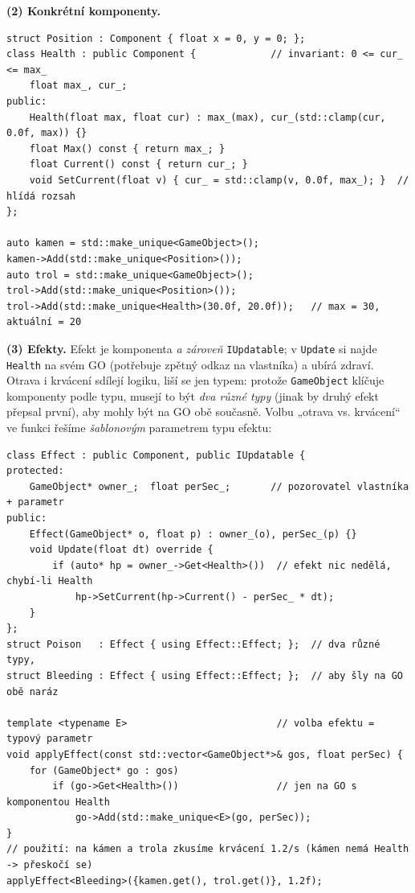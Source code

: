 \documentclass[11pt,a4paper]{article}
\begin{document}
\begin{priklad}
\textbf{(2) Konkrétní komponenty.}
\begin{lstlisting}[style=cpp]
struct Position : Component { float x = 0, y = 0; };
class Health : public Component {             // invariant: 0 <= cur_ <= max_
    float max_, cur_;
public:
    Health(float max, float cur) : max_(max), cur_(std::clamp(cur, 0.0f, max)) {}
    float Max() const { return max_; }
    float Current() const { return cur_; }
    void SetCurrent(float v) { cur_ = std::clamp(v, 0.0f, max_); }  // hlídá rozsah
};

auto kamen = std::make_unique<GameObject>();
kamen->Add(std::make_unique<Position>());
auto trol = std::make_unique<GameObject>();
trol->Add(std::make_unique<Position>());
trol->Add(std::make_unique<Health>(30.0f, 20.0f));   // max = 30, aktuální = 20
\end{lstlisting}

\textbf{(3) Efekty.} Efekt je komponenta \emph{a zároveň} \texttt{IUpdatable}; v \texttt{Update} si najde \texttt{Health} na svém GO (potřebuje zpětný odkaz na vlastníka) a ubírá zdraví. Otrava i krvácení sdílejí logiku, liší se jen typem: protože \texttt{GameObject} klíčuje komponenty podle typu, musejí to být \emph{dva různé typy} (jinak by druhý efekt přepsal první), aby mohly být na GO obě současně. Volbu „otrava vs. krvácení`` ve funkci řešíme \emph{šablonovým} parametrem typu efektu:

\begin{lstlisting}[style=cpp]
class Effect : public Component, public IUpdatable {
protected:
    GameObject* owner_;  float perSec_;       // pozorovatel vlastníka + parametr
public:
    Effect(GameObject* o, float p) : owner_(o), perSec_(p) {}
    void Update(float dt) override {
        if (auto* hp = owner_->Get<Health>())  // efekt nic nedělá, chybí-li Health
            hp->SetCurrent(hp->Current() - perSec_ * dt);
    }
};
struct Poison   : Effect { using Effect::Effect; };  // dva různé typy,
struct Bleeding : Effect { using Effect::Effect; };  // aby šly na GO obě naráz

template <typename E>                          // volba efektu = typový parametr
void applyEffect(const std::vector<GameObject*>& gos, float perSec) {
    for (GameObject* go : gos)
        if (go->Get<Health>())                 // jen na GO s komponentou Health
            go->Add(std::make_unique<E>(go, perSec));
}
// použití: na kámen a trola zkusíme krvácení 1.2/s (kámen nemá Health -> přeskočí se)
applyEffect<Bleeding>({kamen.get(), trol.get()}, 1.2f);
\end{lstlisting}


\end{priklad}
\end{document}
